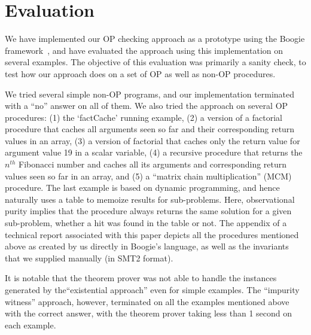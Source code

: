 \section{Evaluation}\label{sec:experiments}

We have implemented our OP checking approach as a prototype using the Boogie
framework~\cite{leino2008boogie}, and have evaluated the approach using
this implementation on several examples. The objective of this evaluation
was primarily a sanity check, to test how our approach does on a set of
OP as well as non-OP procedures.

We tried several simple non-OP programs, and our implementation terminated
with a ``no'' answer on all of them.  We also tried the approach on several
OP procedures: (1) the `factCache' running example, (2) a version of
a factorial procedure that caches all arguments seen so far and their
corresponding return values in an array, (3) a version of factorial that caches
only the return value for argument value 19 in a scalar variable, (4) a
recursive procedure that returns the $n^\mathit{th}$ Fibonacci number and
caches all its arguments and corresponding return values seen so far in an
array, and (5) a ``matrix chain multiplication'' (MCM) procedure.
The last example  is based
on dynamic programming, and hence naturally uses a table to memoize 
results for sub-problems. Here, observational purity implies that the procedure always
returns the same solution for a given sub-problem, whether a hit was found
in the table or not.  The appendix of a technical report associated with
this paper  depicts all the procedures
mentioned above as created by us directly in Boogie's language, as well as
the invariants that we supplied manually (in  SMT2
format).

It is notable that the theorem prover was not able to handle the instances
generated by the``existential approach'' even for simple examples.
The ``impurity witness'' approach, however,
terminated on all the examples mentioned above with the correct answer,
with the theorem prover taking less than 1 second on each example.

